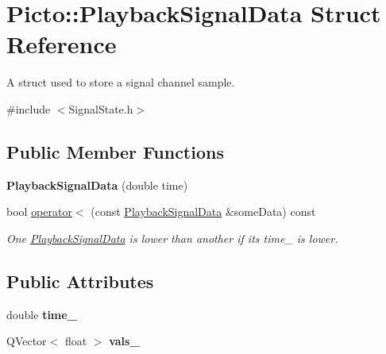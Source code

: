 \hypertarget{struct_picto_1_1_playback_signal_data}{\section{Picto\-:\-:Playback\-Signal\-Data Struct Reference}
\label{struct_picto_1_1_playback_signal_data}
}


A struct used to store a signal channel sample.  




{\ttfamily \#include $<$Signal\-State.\-h$>$}

\subsection*{Public Member Functions}
\begin{DoxyCompactItemize}
\item 
\hypertarget{struct_picto_1_1_playback_signal_data_aa1ae0c376f7e6efc20d50f447ff73cff}{{\bfseries Playback\-Signal\-Data} (double time)}\label{struct_picto_1_1_playback_signal_data_aa1ae0c376f7e6efc20d50f447ff73cff}

\item 
\hypertarget{struct_picto_1_1_playback_signal_data_aa2f091ae75edfc44ce7da95adbf5590e}{bool \hyperlink{struct_picto_1_1_playback_signal_data_aa2f091ae75edfc44ce7da95adbf5590e}{operator$<$} (const \hyperlink{struct_picto_1_1_playback_signal_data}{Playback\-Signal\-Data} \&some\-Data) const }\label{struct_picto_1_1_playback_signal_data_aa2f091ae75edfc44ce7da95adbf5590e}

\begin{DoxyCompactList}\small\item\em One \hyperlink{struct_picto_1_1_playback_signal_data}{Playback\-Signal\-Data} is lower than another if its time\-\_\- is lower. \end{DoxyCompactList}\end{DoxyCompactItemize}
\subsection*{Public Attributes}
\begin{DoxyCompactItemize}
\item 
\hypertarget{struct_picto_1_1_playback_signal_data_a85b6956a18ab9e19743c3ceda5f909c1}{double {\bfseries time\-\_\-}}\label{struct_picto_1_1_playback_signal_data_a85b6956a18ab9e19743c3ceda5f909c1}

\item 
\hypertarget{struct_picto_1_1_playback_signal_data_afb181d0bf462d8fc160c21ee63c38093}{Q\-Vector$<$ float $>$ {\bfseries vals\-\_\-}}\label{struct_picto_1_1_playback_signal_data_afb181d0bf462d8fc160c21ee63c38093}

\end{DoxyCompactItemize}


